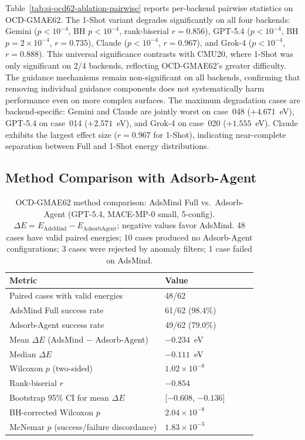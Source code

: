 \documentclass[%
 preprint,
 superscriptaddress,
 amsmath,amssymb,
 aps,
 prb,
 floatfix,
]{revtex4-2}
\begin{document}
Table~\ref{tab:si-ocd62-ablation-pairwise} reports per-backend pairwise statistics on OCD-GMAE62. The 1-Shot variant degrades significantly on all four backends: Gemini ($p < 10^{-4}$, BH $p < 10^{-4}$, rank-biserial $r = 0.856$), GPT-5.4 ($p < 10^{-4}$, BH $p = 2 \times 10^{-4}$, $r = 0.735$), Claude ($p < 10^{-4}$, $r = 0.967$), and Grok-4 ($p < 10^{-4}$, $r = 0.888$). This universal significance contrasts with CMU20, where 1-Shot was only significant on 2/4 backends, reflecting OCD-GMAE62's greater difficulty. The guidance mechanisms remain non-significant on all backends, confirming that removing individual guidance components does not systematically harm performance even on more complex surfaces. The maximum degradation cases are backend-specific: Gemini and Claude are jointly worst on case~048 ($+4.671$~eV), GPT-5.4 on case~014 ($+2.571$~eV), and Grok-4 on case~020 ($+1.555$~eV). Claude exhibits the largest effect size ($r = 0.967$ for 1-Shot), indicating near-complete separation between Full and 1-Shot energy distributions.

\subsection{Method Comparison with Adsorb-Agent}

\begin{table}[ht]
\centering
\scriptsize
\caption{OCD-GMAE62 method comparison: AdsMind Full vs.\ Adsorb-Agent (GPT-5.4, MACE-MP-0 small, 5-config). $\Delta E = E_\mathrm{AdsMind} - E_\mathrm{AdsorbAgent}$; negative values favor AdsMind. 48 cases have valid paired energies; 10 cases produced no Adsorb-Agent configurations; 3 cases were rejected by anomaly filters; 1 case failed on AdsMind.}
\label{tab:si-ocd62-adsorbagent}
\begin{tabular}{llrrr}
\toprule
Metric & Value \\
\midrule
Paired cases with valid energies & 48/62 \\
AdsMind Full success rate & 61/62 (98.4\%) \\
Adsorb-Agent success rate & 49/62 (79.0\%) \\
Mean $\Delta E$ (AdsMind $-$ Adsorb-Agent) & $-0.234$~eV \\
Median $\Delta E$ & $-0.111$~eV \\
Wilcoxon $p$ (two-sided) & $1.02 \times 10^{-8}$ \\
Rank-biserial $r$ & $-0.854$ \\
Bootstrap 95\% CI for mean $\Delta E$ & [$-0.608$, $-0.136$] \\
BH-corrected Wilcoxon $p$ & $2.04 \times 10^{-8}$ \\
McNemar $p$ (success/failure discordance) & $1.83 \times 10^{-3}$ \\
\bottomrule
\end{tabular}
\end{table}
\end{document}
